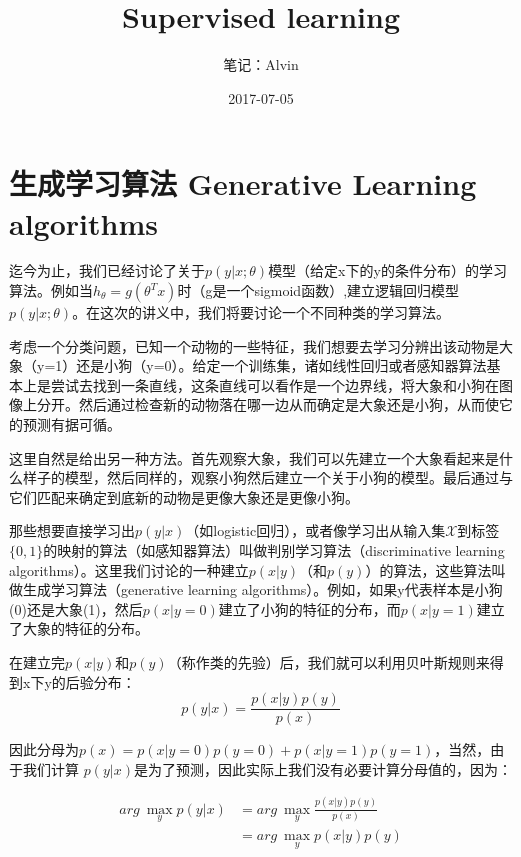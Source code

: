 \documentclass[UTF8]{ctexart}
\begin{document}
\title{Supervised learning}
\author{笔记：Alvin}
\date{2017-07-05}

\maketitle

\tableofcontents
\newpage

\section{生成学习算法 Generative Learning algorithms}

迄今为止，我们已经讨论了关于$p(y|x;\theta)$模型（给定x下的y的条件分布）的学习算法。例如当$h_{\theta}=g(\theta^{T}x)$时（g是一个sigmoid函数）,建立逻辑回归模型$p(y|x;\theta)$。在这次的讲义中，我们将要讨论一个不同种类的学习算法。

考虑一个分类问题，已知一个动物的一些特征，我们想要去学习分辨出该动物是大象（y=1）还是小狗（y=0）。给定一个训练集，诸如线性回归或者感知器算法基本上是尝试去找到一条直线，这条直线可以看作是一个边界线，将大象和小狗在图像上分开。然后通过检查新的动物落在哪一边从而确定是大象还是小狗，从而使它的预测有据可循。

这里自然是给出另一种方法。首先观察大象，我们可以先建立一个大象看起来是什么样子的模型，然后同样的，观察小狗然后建立一个关于小狗的模型。最后通过与它们匹配来确定到底新的动物是更像大象还是更像小狗。

那些想要直接学习出$p(y|x)$（如logistic回归），或者像学习出从输入集$\mathcal{X}$到标签$\{0,1\}$的映射的算法（如感知器算法）叫做判别学习算法（discriminative learning algorithms）。这里我们讨论的一种建立$p(x|y)$（和$p(y)$）的算法，这些算法叫做生成学习算法（generative learning algorithms）。例如，如果y代表样本是小狗(0)还是大象(1)，然后$p(x|y=0)$建立了小狗的特征的分布，而$p(x|y=1)$建立了大象的特征的分布。

在建立完$p(x|y)$和$p(y)$（称作类的先验）后，我们就可以利用贝叶斯规则来得到x下y的后验分布：\[p(y|x) = \frac{p(x|y)p(y)}{p(x)} \]

因此分母为$p(x) = p(x|y=0)p(y=0) + p(x|y=1)p(y=1)$，当然，由于我们计算 $p(y|x) $是为了预测，因此实际上我们没有必要计算分母值的，因为：

\begin{align*}
arg \ \mathop{max}\limits_{y} p(y|x) & = arg \ \mathop{max}\limits_{y} \frac{p(x|y)p(y)}{p(x)}\\
& =  arg \ \mathop{max}\limits_{y} p(x|y)p(y)
\end{align*}
\end{document}

